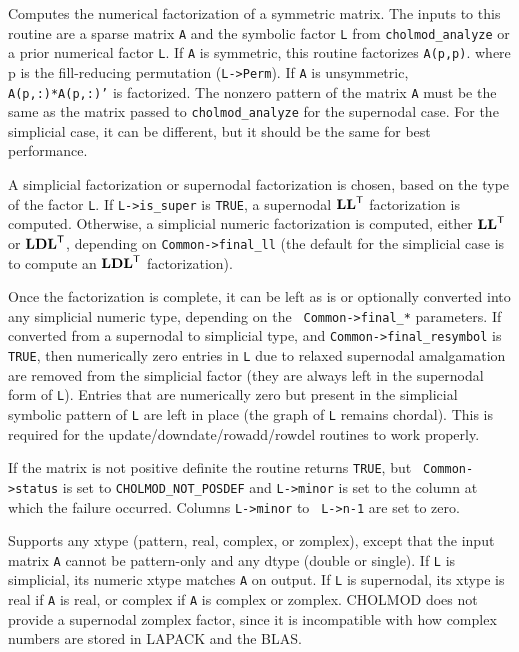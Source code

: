 \documentclass[11pt]{article}
\newcommand{\m}[1]{{\bf{#1}}}       %
\newcommand{\tr}{^{\sf T}}          %
\begin{document}
 Computes the numerical factorization of a symmetric
matrix.  The inputs to this routine are a sparse matrix {\tt A} and the
symbolic factor {\tt L} from {\tt cholmod\_analyze} or a prior numerical factor
{\tt L}.  If {\tt A} is symmetric, this routine factorizes {\tt A(p,p)}.  where
p is the fill-reducing permutation ({\tt L->Perm}).  If {\tt A} is unsymmetric,
{\tt A(p,:)*A(p,:)'} is factorized.  The nonzero pattern of the matrix {\tt A}
must be the same as the matrix passed to {\tt cholmod\_analyze} for the
supernodal case.  For the simplicial case, it can be different, but it should
be the same for best performance.

A simplicial factorization or supernodal factorization is chosen, based on the
type of the factor {\tt L}.  If {\tt L->is\_super} is {\tt TRUE}, a supernodal
$\m{LL}\tr$ factorization is computed.  Otherwise, a simplicial numeric
factorization is computed, either $\m{LL}\tr$ or $\m{LDL}\tr$, depending on
{\tt Common->final\_ll} (the default for the simplicial case is to compute an
$\m{LDL}\tr$ factorization).

Once the factorization is complete, it can be left as is or optionally
converted into any simplicial numeric type, depending on the {\tt
Common->final\_*} parameters.  If converted from a supernodal to simplicial
type, and {\tt Common->final\_resymbol} is {\tt TRUE}, then numerically zero
entries in {\tt L} due to relaxed supernodal amalgamation are removed from the
simplicial factor (they are always left in the supernodal form of {\tt L}).
Entries that are numerically zero but present in the simplicial symbolic
pattern of {\tt L} are left in place (the graph of {\tt L} remains chordal).
This is required for the update/downdate/rowadd/rowdel routines to work
properly.

If the matrix is not positive definite the routine returns {\tt TRUE}, but {\tt
Common->status} is set to {\tt CHOLMOD\_NOT\_POSDEF} and {\tt L->minor} is set
to the column at which the failure occurred.  Columns {\tt L->minor} to {\tt
L->n-1} are set to zero.

Supports any xtype (pattern, real, complex, or zomplex), except that the input
matrix {\tt A} cannot be pattern-only and any dtype (double or single).  If
{\tt L} is simplicial, its numeric xtype matches {\tt A} on output.  If {\tt L}
is supernodal, its xtype is real if {\tt A} is real, or complex if {\tt A} is
complex or zomplex.  CHOLMOD does not provide a supernodal zomplex factor,
since it is incompatible with how complex numbers are stored in LAPACK and the
BLAS.
\end{document}
